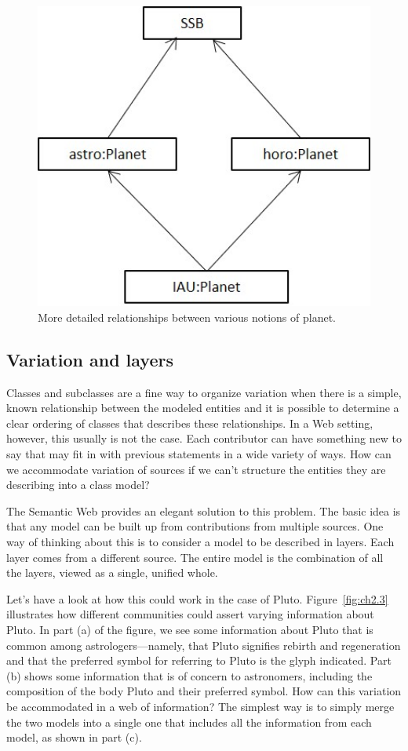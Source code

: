 \begin{figure}
    \centering
    \includegraphics[width=5.0in]{SWWOv3/media/ch2/f02-02.jpg}
    \caption{More detailed relationships between various notions of planet.}
    \label{fig:ch2.2}
\end{figure}


\subsection{Variation and layers}

Classes and subclasses are a fine way to organize variation when there
is a simple, known relationship between the modeled entities and it is
possible to determine a clear ordering of classes that describes these
relationships. In a Web setting, however, this usually is not the case.
Each contributor can have something new to say that may fit in with
previous statements in a wide variety of ways. How can we accommodate
variation of sources if we can't structure the entities they are
describing into a class model?

The Semantic Web provides an elegant solution to this problem. The basic
idea is that any model can be built up from contributions from multiple
sources. One way of thinking about this is to consider a model to be
described in layers. Each layer comes from a different source. The
entire model is the combination of all the layers, viewed as a single,
unified whole.

Let's have a look at how this could work in the case of Pluto. Figure~\ref{fig:ch2.3} 
illustrates how different communities could assert varying
information about Pluto. In part (a) of the figure, we see some
information about Pluto that is common among astrologers---namely, that
Pluto signifies rebirth and regeneration and that the preferred symbol
for referring to Pluto is the glyph indicated. Part (b) shows some
information that is of concern to astronomers, including the composition
of the body Pluto and their preferred symbol. How can this variation be
accommodated in a web of information? The simplest way is to simply
merge the two models into a single one that includes all the information
from each model, as shown in part (c).

